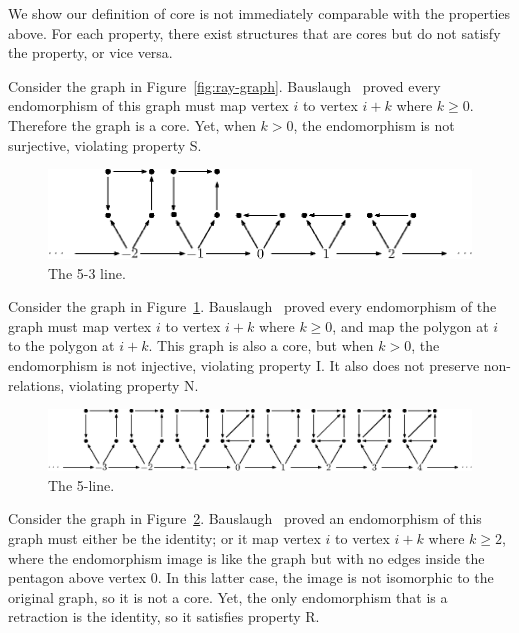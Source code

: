 \documentclass[acmsmall,screen,nonacm,review]{acmart}
\begin{document}
We show our definition of core is not immediately comparable with 
 the properties above.
For each property, there exist structures that are cores 
 but do not satisfy the property,
 or vice versa.
% 
% 
\begin{example}
    Consider the graph in Figure~\ref{fig:ray-graph}.
    Bauslaugh~\cite{bauslaugh1994homomorphisms} proved 
    every endomorphism of this graph must map vertex $i$ to 
    vertex $i+k$ where $k \geq 0$.
    Therefore the graph is a core.
    Yet, when $k > 0$, the endomorphism is not surjective,
    violating property S.
\end{example}
% 
\begin{figure}
    \centering
    \includegraphics[height=.8in]{fig/5-3.eps}
    \caption{The 5-3 line.}
    \label{fig:5-3-line}
\end{figure}
% 
\begin{example}
    Consider the graph in Figure~\ref{fig:5-3-line}. 
    Bauslaugh~\cite{bauslaugh1994homomorphisms} proved every 
    endomorphism of the graph must map vertex $i$ to vertex $i+k$ 
    where $k \geq 0$,
    and map the polygon at $i$ to the polygon at $i+k$.
    This graph is also a core, but when $k>0$, 
    the endomorphism is not injective, violating property I.
    It also does not preserve non-relations, violating property N.
\end{example}
% 
\begin{figure}
    \centering
    \includegraphics[height=.8in]{fig/5-line.eps}
    \caption{The 5-line.}
    \label{fig:5-line}
\end{figure}
% 
\begin{example}
    Consider the graph in Figure~\ref{fig:5-line}.
    Bauslaugh~\cite{bauslaugh1994homomorphisms} proved an 
    endomorphism of this graph must either be the identity; 
    or it map vertex $i$ to vertex $i+k$ where $k \geq 2$,
    where the endomorphism image is like the graph but with 
    no edges inside the pentagon above vertex $0$.
    In this latter case, the image is not isomorphic to 
    the original graph, so it is not a core.
    Yet, the only endomorphism that is a retraction is
    the identity, so it satisfies property R.
\end{example}
\end{document}
